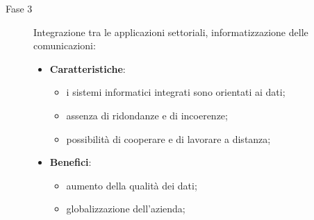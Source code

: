 \begin{description}
    \item[Fase 3] Integrazione tra le applicazioni settoriali, informatizzazione delle comunicazioni:
        \begin{itemize}
            \item \textbf{Caratteristiche}:
                \begin{itemize}
                    \item i sistemi informatici integrati sono orientati ai dati;
                    \item assenza di ridondanze e di incoerenze;
                    \item possibilità di cooperare e di lavorare a distanza;
                \end{itemize}
            \item \textbf{Benefici}:
                \begin{itemize}
                    \item aumento della qualità dei dati;
                    \item globalizzazione dell'azienda;
                \end{itemize}
        \end{itemize}
\end{description}
%
